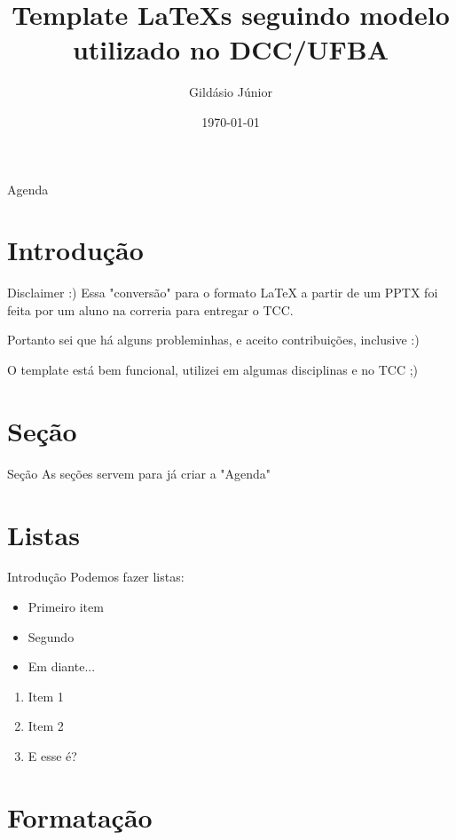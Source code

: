 \documentclass[aspectratio=169,xcolor=table]{beamer}
\author{Gildásio Júnior}
\title{Template LaTeXs seguindo modelo utilizado no DCC/UFBA}
\institute{Universidade Federal da Bahia}
\date{\today}
\begin{document}
\begin{frame}
    \titlepage
\end{frame}

\begin{frame}{Agenda}
	\tableofcontents
\end{frame}

\section{Introdução}

\begin{frame}{Disclaimer :)}
    Essa "conversão" para o formato LaTeX \cite{mittelbach2004latex} a partir de
    um PPTX foi feita por um aluno na correria para entregar o TCC.

    Portanto sei que há alguns probleminhas, e aceito contribuições, inclusive :)

    O template está bem funcional, utilizei em algumas disciplinas e no TCC ;)
\end{frame}

\section{Seção}

\begin{frame}{Seção}
    As seções servem para já criar a "Agenda"
\end{frame}

\section{Listas}

\begin{frame}{Introdução}
    Podemos fazer listas:
	\begin{itemize}
		\item Primeiro item
		\item Segundo
        \item Em diante...
	\end{itemize}
	\begin{enumerate}
		\item Item 1
        \item Item 2
		\item E esse é?
	\end{enumerate}
\end{frame}

\section{Formatação}
\end{document}
